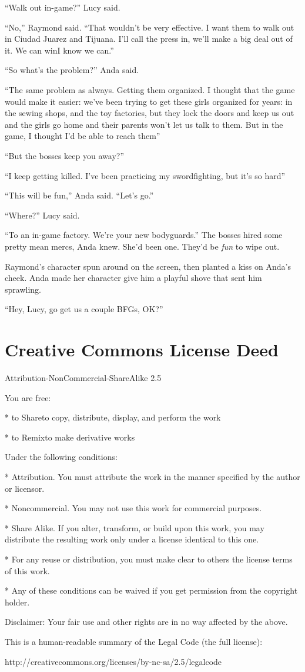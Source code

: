 “Walk out in-game?” Lucy said.

“No,” Raymond said. “That wouldn’t be very effective. I want them
to walk out in Ciudad Juarez and Tijuana. I’ll call the press in,
we’ll make a big deal out of it. We can win\dash{}I know we can.”

“So what’s the problem?” Anda said.

“The same problem as always. Getting them organized. I thought that
the game would make it easier: we’ve been trying to get these girls
organized for years: in the sewing shops, and the toy factories,
but they lock the doors and keep us out and the girls go home and
their parents won’t let us talk to them. But in the game, I thought
I’d be able to reach them\dash{}”

“But the bosses keep you away?”

“I keep getting killed. I’ve been practicing my swordfighting, but
it’s so hard\dash{}”

“This will be fun,” Anda said. “Let’s go.”

“Where?” Lucy said.

“To an in-game factory. We’re your new bodyguards.” The bosses
hired some pretty mean mercs, Anda knew. She’d been one. They’d be
\emph{fun} to wipe out.

Raymond’s character spun around on the screen, then planted a kiss
on Anda’s cheek. Anda made her character give him a playful shove
that sent him sprawling.

“Hey, Lucy, go get us a couple BFGs, OK?”

\section{Creative Commons License Deed}

Attribution-NonCommercial-ShareAlike 2.5

You are free:

* to Share\dash{}to copy, distribute, display, and perform the work

* to Remix\dash{}to make derivative works

Under the following conditions:

* Attribution. You must attribute the work in the manner specified
by the author or licensor.

* Noncommercial. You may not use this work for commercial
purposes.

* Share Alike. If you alter, transform, or build upon this work,
you may distribute the resulting work only under a license
identical to this one.



* For any reuse or distribution, you must make clear to others the
license terms of this work.

* Any of these conditions can be waived if you get permission from
the copyright holder.

Disclaimer: Your fair use and other rights are in no way affected
by the above.

This is a human-readable summary of the Legal Code (the full
license):

http://creativecommons.org/licenses/by-nc-sa/2.5/legalcode


